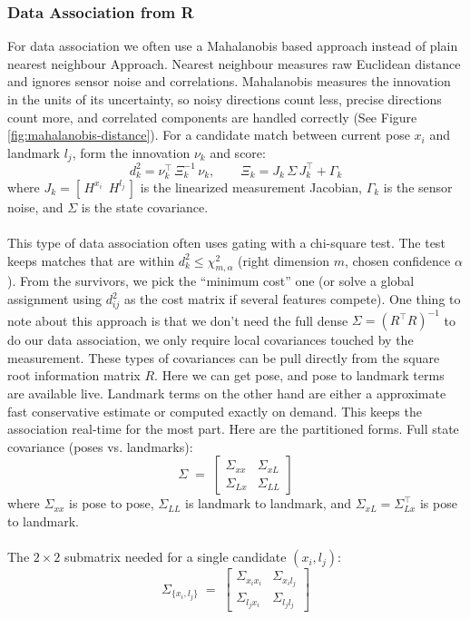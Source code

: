 \subsubsection{Data Association from R}\label{sssec:iSAM-data-association}
For data association we often use a Mahalanobis based approach instead of plain nearest neighbour Approach. Nearest neighbour measures raw Euclidean distance and ignores sensor noise and correlations. Mahalanobis measures the innovation in the units of its uncertainty, so noisy directions count less, precise directions count more, and correlated components are handled correctly (See Figure \ref{fig:mahalanobis-distance}). For a candidate match between current pose $x_i$ and landmark $l_j$, form the innovation $\nu_k$ and score:
$$
    d_k^2=\nu_k^\top\,\Xi_k^{-1}\,\nu_k,\qquad
    \Xi_k=J_k\,\Sigma\,J_k^\top+\Gamma_k
$$
\noindent
where $J_k=[\,H^{x_i}\ \ H^{l_j}\,]$ is the linearized measurement Jacobian, $\Gamma_k$ is the sensor noise, and $\Sigma$ is the state covariance. 
\\ \\
This type of data association often uses gating with a chi-square test. The test keeps matches that are within $d_k^2\le \chi^2_{m,\alpha}$ (right dimension $m$, chosen confidence $\alpha$). From the survivors, we pick the ``minimum cost'' one (or solve a global assignment using $d_{ij}^2$ as the cost matrix if several features compete). One thing to note about this approach is that we don't need the full dense $\Sigma=(R^\top R)^{-1}$ to do our data association, we only require local covariances touched by the measurement. These types of covariances can be pull directly from the square root information matrix $R$. Here we can get pose, and pose to landmark terms are available live. Landmark terms on the other hand are either a approximate fast conservative estimate or computed exactly on demand. This keeps the association real-time for the most part.
Here are the partitioned forms.
Full state covariance (poses vs. landmarks):
$$
    \Sigma \;=\;
    \begin{bmatrix}
    \Sigma_{xx} & \Sigma_{xL}\\[4pt]
    \Sigma_{Lx} & \Sigma_{LL}
    \end{bmatrix}
$$
\noindent
where $\Sigma_{xx}$ is pose to pose, $\Sigma_{LL}$ is landmark to landmark, and $\Sigma_{xL}=\Sigma_{Lx}^\top$ is pose to landmark.
\\ \\
The $2\times2$ submatrix needed for a single candidate $(x_i,l_j)$:
$$
\Sigma_{\{x_i,l_j\}} \;=\;
\begin{bmatrix}
\Sigma_{x_i x_i} & \Sigma_{x_i l_j}\\[4pt]
\Sigma_{l_j x_i} & \Sigma_{l_j l_j}
\end{bmatrix}
$$
